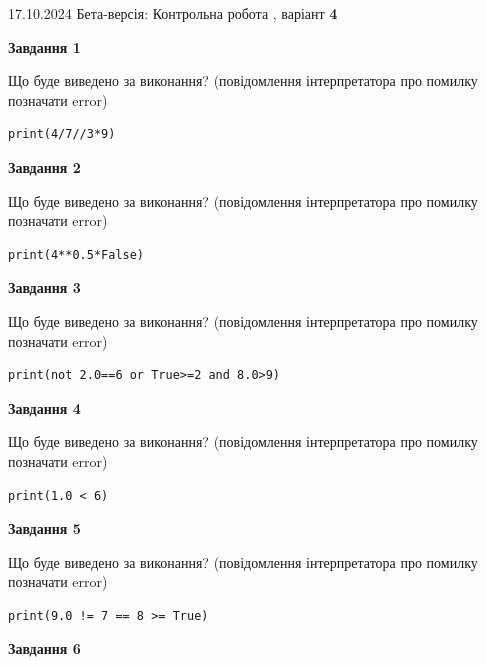 \documentclass[12pt, ukrainian]{article}
\begin{document}
{\Large{17.10.2024 Бета-версія: Контрольна робота , варіант  \No \textbf { 4 }\par}}
{
\begin {large}
{\begin {center}\textbf{Завдання 1}\end {center}}

Що буде виведено за виконання? (повідомлення інтерпретатора про помилку позначати error)\par
\begin{verbatim}
print(4/7//3*9)
\end{verbatim}

{\begin {center}\textbf{Завдання 2}\end {center}}

Що буде виведено за виконання? (повідомлення інтерпретатора про помилку позначати error)\par
\begin{verbatim}
print(4**0.5*False)
\end{verbatim}

{\begin {center}\textbf{Завдання 3}\end {center}}

Що буде виведено за виконання? (повідомлення інтерпретатора про помилку позначати error)\par
\begin{verbatim}
print(not 2.0==6 or True>=2 and 8.0>9)
\end{verbatim}

{\begin {center}\textbf{Завдання 4}\end {center}}

Що буде виведено за виконання? (повідомлення інтерпретатора про помилку позначати error)\par
\begin{verbatim}
print(1.0 < 6)
\end{verbatim}

{\begin {center}\textbf{Завдання 5}\end {center}}

Що буде виведено за виконання? (повідомлення інтерпретатора про помилку позначати error)\par
\begin{verbatim}
print(9.0 != 7 == 8 >= True)
\end{verbatim}

{\begin {center}\textbf{Завдання 6}\end {center}}


\end{large}}
\end{document}
